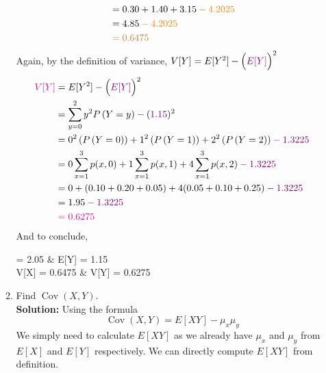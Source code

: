 \documentclass[12pt]{article}
\newcommand*\widefbox[1]{\fbox{\hspace{2em}#1\hspace{2em}}}
\newcommand{\pars}[1]{\left( {#1} \right) }
\newcommand{\prob}[1]{P \left( {#1} \right) }
\begin{document}
\begin{enumerate}
\begin{enumerate}
\begin{align}
            &= 0.30 + 1.40 + 3.15 \color{orange}- 4.2025\color{black} \notag\\
            &= 4.85 \color{orange}- 4.2025\color{black} \notag\\
            & \color{brown}= 0.6475\notag
        \end{align}
        Again, by the definition of variance, $V[Y] = E[Y^2] - \Big(\color{violet}E[Y]\color{black}\Big)^2$
        \\\begin{align}
            \color{magenta} V[Y] \color{black} &= E[Y^2] - \Big(\color{violet}E[Y]\color{black}\Big)^2 \notag\\
            &= \sum_{y=0}^2 y^2 \prob{Y=y} - (\color{violet}1.15\color{black})^2\notag\\
            &= 0^2\pars{  \prob{Y=0}} + 1^2\pars{\prob{Y=1}} + 2^2\pars{\prob{Y=2}} \color{violet} - 1.3225 \notag \\
            &= 0 \sum_{x=1}^3 p(x,0) + 1 \sum_{x=1}^3 p(x,1) + 4 \sum_{x=1}^3 p(x,2) \color{violet} - 1.3225 \notag\\
            &= 0 + (0.10 + 0.20 + 0.05) + 4(0.05 + 0.10 + 0.25) \color{violet} - 1.3225\notag\\
            &= 1.95 \color{violet} - 1.3225\notag\\
            &  \color{magenta} = 0.6275\notag
        \end{align}
        And to conclude,
        \begin{empheq}[box=\widefbox]{align}
        \color{orange}E[X] = 2.05 \hspace{.7in}&\hspace{.7in} \color{violet}E[Y] = 1.15\notag\\
        \color{brown}V[X] = 0.6475 \hspace{.7in}&\hspace{.7in} \color{magenta} V[Y] = 0.6275\notag
        \end{empheq}
        \vspace{0.15in}
        \item Find $\operatorname{Cov}(X, Y)$.
        \vspace{0.15in}\\
        \textbf{Solution:} Using the formula
        $$\operatorname{Cov}(X, Y) = E[XY] - \mu_x \mu_y$$
        We simply need to calculate $E[XY]$ as we already have $\mu_x$ and $\mu_y$ from $E[X]$ and $E[Y]$ respectively. We can directly compute $E[XY]$ from definition.\\

\end{enumerate}
\end{enumerate}
\end{document}
